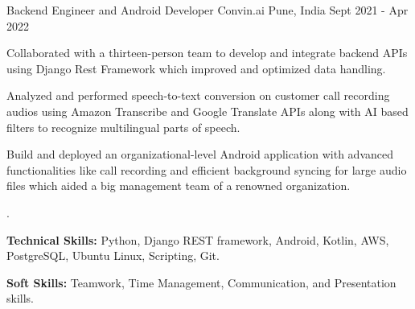

\begin{cventries}

  \cventry
    {Backend Engineer and Android Developer} %
    {Convin.ai} %
    {Pune, India} %
    {Sept 2021 - Apr 2022} %
    {
      \begin{cvitems} %
        \item {Collaborated with a thirteen-person team to develop and integrate backend APIs using Django Rest Framework which improved and optimized data handling.}
        \item {Analyzed and performed speech-to-text conversion on customer call recording audios using Amazon Transcribe and Google Translate APIs along with AI based filters to recognize multilingual parts of speech.}
        \item {Build and deployed an organizational-level Android application with advanced functionalities like call recording and efficient background syncing for large audio files which aided a big management team of a renowned organization.}
        \item {.}
        \item {\textbf{Technical Skills:} Python, Django REST framework, Android, Kotlin, AWS, PostgreSQL, Ubuntu Linux, Scripting, Git.}
        \item {\textbf{Soft Skills:} Teamwork, Time Management, Communication, and Presentation skills.}
      \end{cvitems}
    }

\end{cventries}
